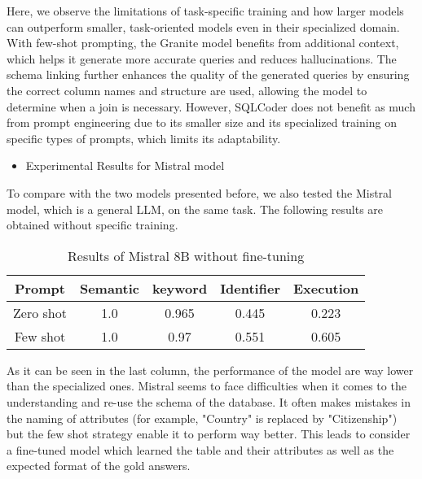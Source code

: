 \documentclass[12pt,a4paper]{article}
\begin{document}
Here, we observe the limitations of task-specific training and how larger models can outperform smaller, task-oriented models even in their specialized domain.
With few-shot prompting, the Granite model benefits from additional context, which helps it generate more accurate queries and reduces hallucinations. The schema linking further enhances the quality of the generated queries by ensuring the correct column names and structure are used, allowing the model to determine when a join is necessary.
However, SQLCoder does not benefit as much from prompt engineering due to its smaller size and its specialized training on specific types of prompts, which limits its adaptability.

\begin{itemize}
\item Experimental Results for Mistral model
\end{itemize}

To compare with the two models presented before, we also tested the Mistral model, which is a general LLM, on the same task. The following results are obtained without specific training.

\begin{table}[h]
    \centering
    \begin{tabular}{|c|c|c|c|c|}
        \hline
         \textbf{Prompt}& \textbf{Semantic} & \textbf{keyword}&\textbf{Identifier}& \textbf{Execution}\\
         \hline
         Zero shot& 1.0&0.965&0.445&0.223 \\
         Few shot& 1.0&0.97&0.551&0.605\\
         \hline
    \end{tabular}
    \caption{Results of Mistral 8B without fine-tuning}
    \label{tab:my_label}
\end{table}
As it can be seen in the last column, the performance of the model are way lower than the specialized ones. Mistral seems to face difficulties when it comes to the understanding and re-use the schema of the database. It often makes mistakes in the naming of attributes (for example, "Country" is replaced by "Citizenship") but the few shot strategy enable it to perform way better. This leads to consider a fine-tuned model which learned the table and their attributes as well as the expected format of the gold answers. 
\end{document}
